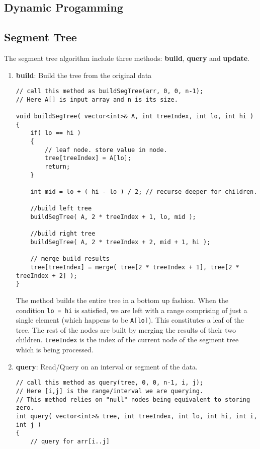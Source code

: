 \subsection{Dynamic Progamming}


\subsection{Segment Tree}
The segment tree algorithm include three methods: \textbf{build}, \textbf{query} and \textbf{update}.

\begin{enumerate}
\item \textbf{build}: Build the tree from the original data
\setcounter{lstlisting}{0}
\begin{lstlisting}[style=customc, caption={Build}]
// call this method as buildSegTree(arr, 0, 0, n-1);
// Here A[] is input array and n is its size.

void buildSegTree( vector<int>& A, int treeIndex, int lo, int hi )
{
    if( lo == hi )
    {
        // leaf node. store value in node.
        tree[treeIndex] = A[lo];
        return;
    }

    int mid = lo + ( hi - lo ) / 2; // recurse deeper for children.

    //build left tree
    buildSegTree( A, 2 * treeIndex + 1, lo, mid );

    //build right tree
    buildSegTree( A, 2 * treeIndex + 2, mid + 1, hi );

    // merge build results
    tree[treeIndex] = merge( tree[2 * treeIndex + 1], tree[2 * treeIndex + 2] );
}
\end{lstlisting}
The method builds the entire tree in a bottom up fashion. When the condition \lstinline[language=C++, basicstyle=\small\ttfamily, keywordstyle=\bfseries\color{green!40!black}]|lo = hi| is satisfied, we are left with a range comprising of just a single element (which happens to be \lstinline[language=C++, basicstyle=\small\ttfamily, keywordstyle=\bfseries\color{green!40!black}]|A[lo]|). This constitutes a leaf of the tree. The rest of the nodes are built by merging the results of their two children. \lstinline[language=C++, basicstyle=\small\ttfamily, keywordstyle=\bfseries\color{green!40!black}]|treeIndex| is the index of the current node of the segment tree which is being processed.
\item \textbf{query}: Read/Query on an interval or segment of the data.

\begin{lstlisting}[style=customc, caption={Query/Read}]
// call this method as query(tree, 0, 0, n-1, i, j);
// Here [i,j] is the range/interval we are querying.
// This method relies on "null" nodes being equivalent to storing zero.
int query( vector<int>& tree, int treeIndex, int lo, int hi, int i, int j )
{
    // query for arr[i..j]


\end{lstlisting}
\end{enumerate}
